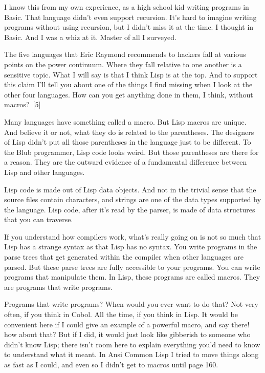 \documentclass[10pt,twoside,openright]{memoir}
\begin{document}
I know this from my own experience, as a high school kid writing programs in Basic. That language didn't even support recursion. It's hard to imagine writing programs without using recursion, but I didn't miss it at the time. I thought in Basic. And I was a whiz at it. Master of all I surveyed.

The five languages that Eric Raymond recommends to hackers fall at various points on the power continuum. Where they fall relative to one another is a sensitive topic. What I will say is that I think Lisp is at the top. And to support this claim I'll tell you about one of the things I find missing when I look at the other four languages. How can you get anything done in them, I think, without macros?~[5]

Many languages have something called a macro. But Lisp macros are unique. And believe it or not, what they do is related to the parentheses. The designers of Lisp didn't put all those parentheses in the language just to be different. To the Blub programmer, Lisp code looks weird. But those parentheses are there for a reason. They are the outward evidence of a fundamental difference between Lisp and other languages.

Lisp code is made out of Lisp data objects. And not in the trivial sense that the source files contain characters, and strings are one of the data types supported by the language. Lisp code, after it's read by the parser, is made of data structures that you can traverse.

If you understand how compilers work, what's really going on is not so much that Lisp has a strange syntax as that Lisp has no syntax. You write programs in the parse trees that get generated within the compiler when other languages are parsed. But these parse trees are fully accessible to your programs. You can write programs that manipulate them. In Lisp, these programs are called macros. They are programs that write programs.

Programs that write programs? When would you ever want to do that? Not very often, if you think in Cobol. All the time, if you think in Lisp. It would be convenient here if I could give an example of a powerful macro, and say there! how about that? But if I did, it would just look like gibberish to someone who didn't know Lisp; there isn't room here to explain everything you'd need to know to understand what it meant. In Ansi Common Lisp I tried to move things along as fast as I could, and even so I didn't get to macros until page 160.
\end{document}
